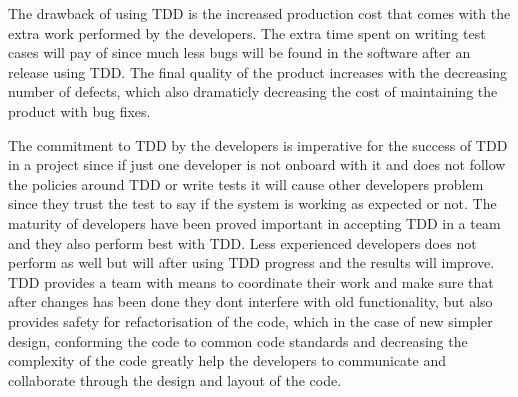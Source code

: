 The drawback of using TDD is the increased production cost that comes with the extra work performed by the developers.
The extra time spent on writing test cases will pay of since much less bugs will be found in the software after an release using TDD. The final quality of the product increases with the decreasing number of defects, which also dramaticly decreasing the cost of maintaining the product with bug fixes.  


The commitment to TDD by the developers is imperative for the success of TDD in a project since if just one developer
is not onboard with it and does not follow the policies around TDD or write tests it will cause other developers problem since they
trust the test to say if the system is working as expected or not. The maturity of developers have been proved important in accepting TDD
in a team and they also perform best with TDD. Less experienced developers does not perform as well but will after using TDD progress and
the results will improve.
TDD provides a team with means to coordinate their work and make sure that after changes has been done they dont interfere with old functionality, but also provides safety for refactorisation of the code, which in the case of new simpler design, conforming the code to common code standards and decreasing the complexity of the code greatly help the developers to communicate and collaborate through the design and layout of the code. 

